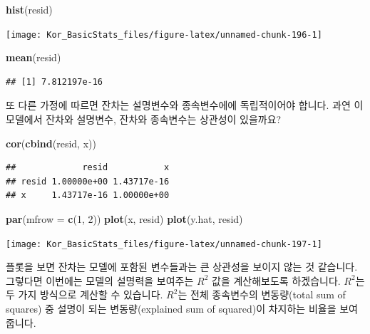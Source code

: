 \documentclass[]{book}
\newenvironment{Shaded}{\begin{snugshade}}{\end{snugshade}}
\newcommand{\DataTypeTok}[1]{\textcolor[rgb]{0.13,0.29,0.53}{#1}}
\newcommand{\DecValTok}[1]{\textcolor[rgb]{0.00,0.00,0.81}{#1}}
\newcommand{\KeywordTok}[1]{\textcolor[rgb]{0.13,0.29,0.53}{\textbf{#1}}}
\newcommand{\NormalTok}[1]{#1}
\begin{document}
\begin{Shaded}
\begin{Highlighting}[]
\KeywordTok{hist}\NormalTok{(resid)}
\end{Highlighting}
\end{Shaded}

\begin{center}\texttt{[image: Kor\_BasicStats\_files/figure-latex/unnamed-chunk-196-1]} \end{center}

\begin{Shaded}
\begin{Highlighting}[]
\KeywordTok{mean}\NormalTok{(resid)}
\end{Highlighting}
\end{Shaded}

\begin{verbatim}
## [1] 7.812197e-16
\end{verbatim}

또 다른 가정에 따르면 잔차는 설명변수와 종속변수에에 독립적이어야 합니다. 과연 이 모델에서 잔차와 설명변수, 잔차와 종속변수는 상관성이 있을까요?

\begin{Shaded}
\begin{Highlighting}[]
\KeywordTok{cor}\NormalTok{(}\KeywordTok{cbind}\NormalTok{(resid, x))}
\end{Highlighting}
\end{Shaded}

\begin{verbatim}
##             resid           x
## resid 1.00000e+00 1.43717e-16
## x     1.43717e-16 1.00000e+00
\end{verbatim}

\begin{Shaded}
\begin{Highlighting}[]
\KeywordTok{par}\NormalTok{(}\DataTypeTok{mfrow =} \KeywordTok{c}\NormalTok{(}\DecValTok{1}\NormalTok{, }\DecValTok{2}\NormalTok{))}
\KeywordTok{plot}\NormalTok{(x, resid)}
\KeywordTok{plot}\NormalTok{(y.hat, resid)}
\end{Highlighting}
\end{Shaded}

\begin{center}\texttt{[image: Kor\_BasicStats\_files/figure-latex/unnamed-chunk-197-1]} \end{center}

플롯을 보면 잔차는 모델에 포함된 변수들과는 큰 상관성을 보이지 않는 것 같습니다. 그렇다면 이번에는 모델의 설명력을 보여주는 \(R^2\) 값을 계산해보도록 하겠습니다. \(R^2\)는 두 가지 방식으로 계산할 수 있습니다. \(R^2\)는 전체 종속변수의 변동량(total sum of squares) 중 설명이 되는 변동량(explained sum of squared)이 차지하는 비율을 보여줍니다.
\end{document}
